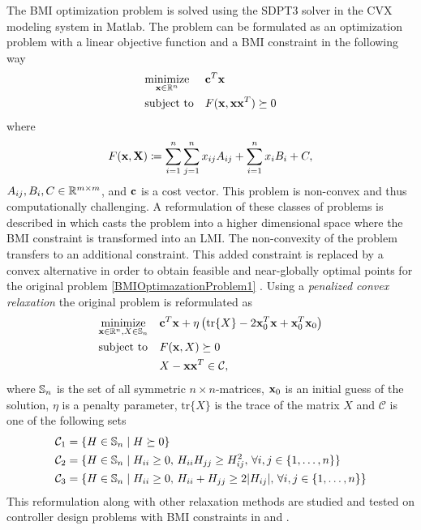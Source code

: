 \documentclass[a4paper,12pt,twoside,BCOR=10mm]{scrbook}
\begin{document}
The BMI optimization problem is solved using the SDPT3 solver in the CVX modeling system in Matlab. The problem can be formulated as an optimization problem with a linear objective function and a BMI constraint in the following way
\begin{align}\label{BMIOptimazationProblem1}
    \begin{aligned}
    & \underset{\mathbf{x}\in \mathbb{R}^{n}}{\text{minimize}} & & \mathbf{c}^T\mathbf{x}\\
    & \text{subject to} & & F(\mathbf{x},\mathbf{x}\mathbf{x}^T) \succeq 0
    \end{aligned}
\end{align}
where
\begin{align*}
    F(\mathbf{x}, \mathbf{X}) \coloneqq \sum_{i = 1}^n\sum_{j = 1}^n x_{ij}A_{ij} + \sum_{i = 1}^nx_iB_i + C,
\end{align*}
$A_{ij}, B_i, C \in \mathbb{R}^{m\times m}$, and $\mathbf{c}$ is a cost vector. This problem is non-convex and thus computationally challenging. A reformulation of these classes of problems is described in \citep{KZM2018BMI1} which casts the problem into a higher dimensional space where the BMI constraint is transformed into an LMI. The non-convexity of the problem transfers to an additional constraint. This added constraint is replaced by a convex alternative in order to obtain feasible and near-globally optimal points for the original problem \eqref{BMIOptimazationProblem1} \citep{KZM2018BMI1}. Using a \textit{penalized convex relaxation} the original problem is reformulated as
\begin{align}
    \begin{aligned}
    & \underset{\mathbf{x} \in \mathbb{R}^{n}, X \in \mathbb{S}_n}{\text{minimize}} & & \mathbf{c}^T\mathbf{x} + \eta\left(\text{tr}\{X\} - 2\mathbf{x}_0^T\mathbf{x} + \mathbf{x}_0^T\mathbf{x}_0\right)\\
    & \text{subject to} & & F(\mathbf{x}, X) \succeq 0\\
    & & & X - \mathbf{x}\mathbf{x}^T \in \mathcal{C},
    \end{aligned}
\end{align}
where $\mathbb{S}_n$ is the set of all symmetric $n \times n$-matrices, $\mathbf{x}_0$ is an initial guess of the solution, $\eta$ is a penalty parameter, $\text{tr}\{X\}$ is the trace of the matrix $X$ and $\mathcal{C}$ is one of the following sets
\begin{align*}
    &\mathcal{C}_1 = \{H\in \mathbb{S}_n \mid H\succeq 0\}\\
    &\mathcal{C}_2 = \{H\in \mathbb{S}_n \mid H_{ii} \geq 0,\, H_{ii}H_{jj} \geq H_{ij}^2, \, \forall i,j\in\{1,\ldots, n\}\}\\
    &\mathcal{C}_3 = \{H\in\mathbb{S}_n \mid H_{ii} \geq 0, \, H_{ii} + H_{jj} \geq 2|H_{ij}|,\, \forall i,j\in\{1,\ldots, n\}\}
\end{align*}
This reformulation along with other relaxation methods are studied and tested on controller design problems with BMI constraints in \citep{KZM2018BMI1} and \citep{KZM2018BMI2}.
\end{document}
